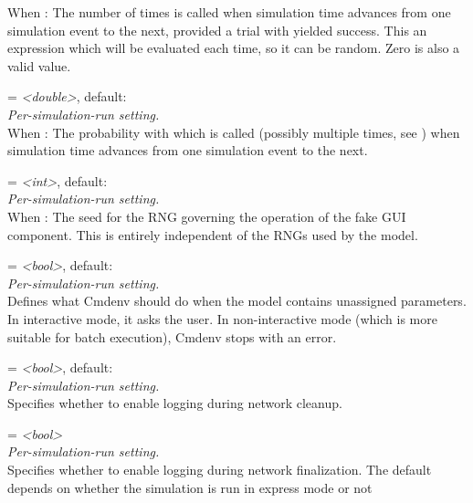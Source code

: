 \begin{description}
    When : The
    number of times  is called when simulation time
    advances from one simulation event to the next, provided a trial with
    yielded success. This an expression which will be evaluated each time, so
    it can be random. Zero is also a valid value.
\item[cmdenv-fake-gui-on-simtime-probability] = \textit{<double>}, default: \\
    \textit{Per-simulation-run setting.}\\
    When : The
    probability with which  is called (possibly
    multiple times, see
    )
    when simulation time advances from one simulation event to the next.
\item[cmdenv-fake-gui-seed] = \textit{<int>}, default: \\
    \textit{Per-simulation-run setting.}\\
    When : The
    seed for the RNG governing the operation of the fake GUI component. This is
    entirely independent of the RNGs used by the model.
\item[cmdenv-interactive] = \textit{<bool>}, default: \\
    \textit{Per-simulation-run setting.}\\
    Defines what Cmdenv should do when the model contains unassigned
    parameters. In interactive mode, it asks the user. In non-interactive mode
    (which is more suitable for batch execution), Cmdenv stops with an error.
\item[cmdenv-log-cleanup] = \textit{<bool>}, default: \\
    \textit{Per-simulation-run setting.}\\
    Specifies whether to enable logging during network cleanup.
\item[cmdenv-log-finalization] = \textit{<bool>}\\
    \textit{Per-simulation-run setting.}\\
    Specifies whether to enable logging during network finalization. The
    default depends on whether the simulation is run in express mode or not

\end{description}
